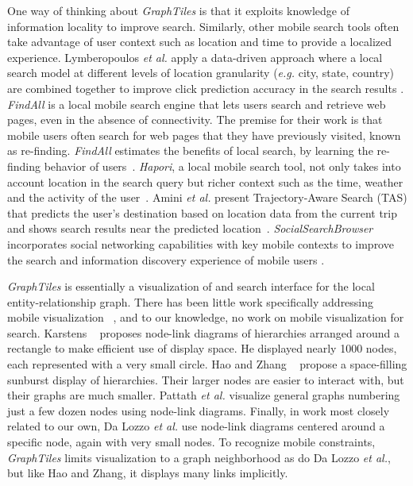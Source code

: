 One way of thinking about \textit{GraphTiles} is that it exploits knowledge of information locality to improve search. Similarly, other mobile search tools often take advantage of user context such as location and time to provide a localized experience. Lymberopoulos \textit{et al.} apply a data-driven approach where a local search model at different levels of location granularity (\textit{e.g.} city, state, country) are combined together to improve click prediction accuracy in the search results \cite{Lymberopoulos:2011}. \textit{FindAll} is a local mobile search engine that lets users search and retrieve web pages, even in the absence of connectivity. The premise for their work is that mobile users often search for web pages that they have previously visited, known as re-finding. \textit{FindAll} estimates the benefits of local search, by learning the re-finding behavior of users~\cite{Balasubramanian:2012}. \textit{Hapori}, a local mobile search tool,  not only takes into account location in the search query but richer context such as the time, weather and the activity of the user~\cite{Lane:2010}. Amini \textit{et al.} present Trajectory-Aware Search (TAS) that predicts the user's destination based on location data from the current trip and shows search results near the predicted location~\cite{Amini:2012}. \textit{SocialSearchBrowser} incorporates social networking capabilities with key mobile contexts to improve the search and information discovery experience of mobile users \cite{Church:2010}.

\textit{GraphTiles} is essentially a visualization of and search interface for the local entity-relationship graph. There has been little work specifically addressing mobile visualization ~\cite{RefWorks:658}, and to our knowledge, no work on mobile visualization for search. Karstens ~\cite{RefWorks:908} proposes node-link diagrams of hierarchies arranged around a rectangle to make efficient use of display space. He displayed nearly 1000 nodes, each represented with a very small circle. Hao and Zhang ~\cite{RefWorks:906} propose a space-filling sunburst display of hierarchies. Their larger nodes are easier to interact with, but their graphs are much smaller. Pattath \textit{et al.}  \cite{RefWorks:896} visualize general graphs numbering just a few dozen nodes using node-link diagrams. Finally, in work most closely related to our own, Da Lozzo \textit{et al.}\cite{springerlink:10.1007/978-3-642-18469-7-14} use node-link diagrams centered around a specific node, again with very small nodes. To recognize mobile constraints, \textit{GraphTiles} limits visualization to a graph neighborhood as do Da Lozzo \textit{et al.}, but like Hao and Zhang, it displays many links implicitly.

